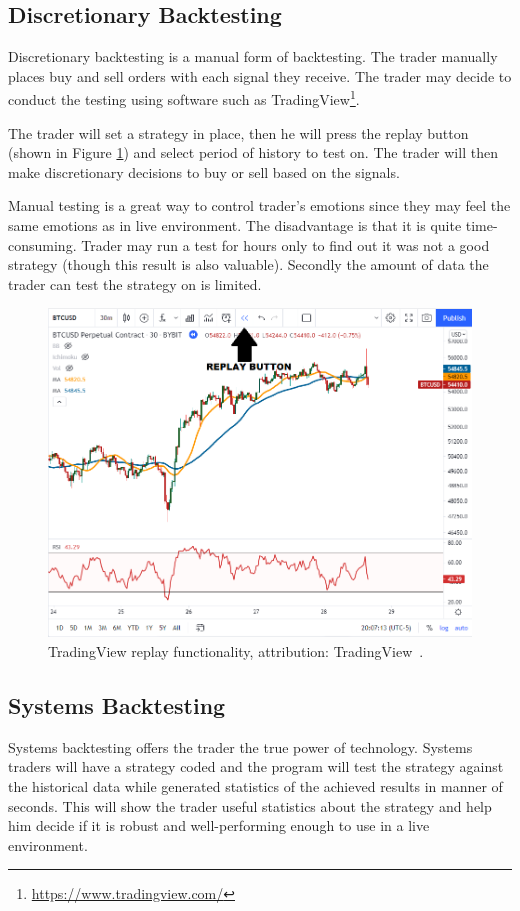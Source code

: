 \subsection*{Discretionary Backtesting}
Discretionary backtesting is a manual form of backtesting. The trader manually places buy and sell orders with each signal they receive. The trader may decide to conduct the testing using software such as TradingView\footnote{\url{https://www.tradingview.com/}}.

The trader will set a strategy in place, then he will press the replay button (shown in Figure \ref{tradingview-figure}) and select period of history to test on. The trader will then make discretionary decisions to buy or sell based on the signals.

Manual testing is a great way to control trader's emotions since they may feel the same emotions as in live environment. The disadvantage is that it is quite time-consuming. Trader may run a test for hours only to find out it was not a good strategy (though this result is also valuable). Secondly the amount of data the trader can test the strategy on is limited.

\begin{figure}[!hbt]
    \centering
    \includegraphics[width=\columnwidth]{figures/tradingview-replay.png}
    \caption{TradingView replay functionality, attribution: TradingView~\cite{backtesting-crypto-trading-strategies}.}
    \label{tradingview-figure}
\end{figure}

\subsection*{Systems Backtesting}
Systems backtesting offers the trader the true power of technology. Systems traders will have a strategy coded and the program will test the strategy against the historical data while generated statistics of the achieved results in manner of seconds. This will show the trader useful statistics about the strategy and help him decide if it is robust and well-performing enough to use in a live environment.

